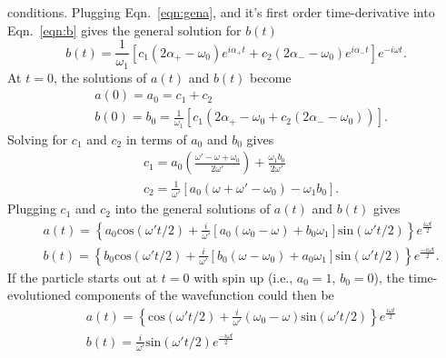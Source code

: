 conditions.  Plugging Eqn.~\ref{eqn:gena}, and it's first order
time-derivative into Eqn.~\ref{eqn:b} gives the general solution for
$b(t)$
%
\begin{equation}
b(t) = \frac{1}{\omega_{1}}[c_{1}(2\alpha_{+}-\omega_{0})e^{i\alpha_{+}t} + c_{2}(2\alpha_{-}-\omega_{0})e^{i\alpha_{-}t}]e^{-i\omega t}.
\end{equation}
%
At $t=0$, the solutions of $a(t)$ and $b(t)$ become
%
\begin{equation}
\begin{split}
& a(0)= a_{0} = c_{1} + c_{2} \\
& b(0) = b_{0} = \frac{1}{\omega_{1}}[c_{1}(2\alpha_{+}-\omega_{0}+ c_{2}(2\alpha_{-}-\omega_{0}))].
\end{split}
\end{equation}
%
Solving for $c_{1}$ and $c_{2}$ in terms of $a_{0}$ and $b_{0}$ gives
%
\begin{equation}
\begin{split}
&c_{1} = a_{0}(\frac{\omega' - \omega + \omega_{0}}{2\omega'}) + \frac{\omega_{1}b_{0}}{2\omega'} \\
&c_{2} = \frac{1}{\omega'}[a_{0}(\omega+\omega'-\omega_{0})-\omega_{1}b_{0}].
\end{split}
\end{equation}
%
Plugging $c_{1}$ and $c_{2}$ into the general solutions of $a(t)$ and
$b(t)$ gives
%
\begin{equation}
  \label{eqn:aNb}
\begin{split}
&a(t) = \left\lbrace a_{0} \textrm{cos}(\omega' t/2) + \frac{i}{\omega'}[a_{0}(\omega_{0}-\omega) + b_{0}\omega_{1}] \textrm{sin}(\omega' t/2)
\right\rbrace e^{\frac{i\omega t}{2}} \\
&b(t) = \left\lbrace b_{0} \textrm{cos}(\omega' t/2) + \frac{i}{\omega'}[b_{0}(\omega-\omega_{0}) + a_{0}\omega_{1}]\textrm{sin}(\omega' t/2) \right\rbrace e^{\frac{-i\omega t}{2}}.
\end{split}
\end{equation}
%
If the particle starts out at $t=0$ with spin up (i.e., $a_{0} =1$,
$b_{0} = 0$), the time-evolutioned components of the wavefunction
could then be
%
\begin{equation}
\begin{split}
&a(t) =  \left\lbrace \textrm{cos}(\omega' t/2) + \frac{i}{\omega'}(\omega_{0}-\omega)\textrm{sin}(\omega' t/2)
\right\rbrace e^{\frac{i\omega t}{2}} \\
&b(t) = \frac{i}{\omega'}\textrm{sin}(\omega' t/2) e^{\frac{-i\omega t}{2}}
\end{split}
\end{equation}
